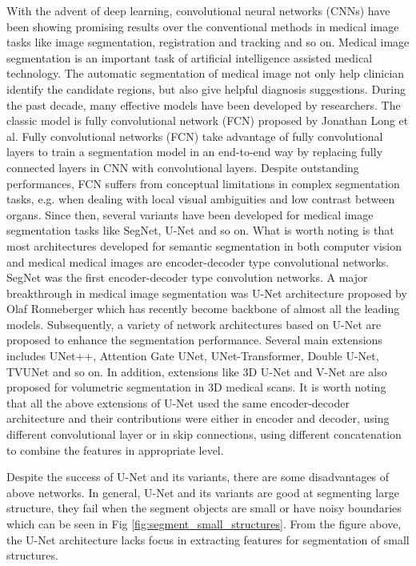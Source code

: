\documentclass{ieeeaccess}
\begin{document}
With the advent of deep learning, convolutional neural networks (CNNs) have been showing promising results over the conventional methods in medical image tasks like image segmentation, registration and tracking and so on. Medical image segmentation is an important task of artificial intelligence assisted medical technology. The automatic segmentation of medical image not only help clinician identify the candidate regions, but also give helpful diagnosis suggestions. During the past decade, many effective models have been developed by researchers. The classic model is fully convolutional network (FCN) proposed by Jonathan Long et al\cite{LongSD15}. Fully convolutional networks (FCN) take advantage of fully convolutional layers to train a segmentation model in an end-to-end way by replacing fully connected layers in CNN with convolutional layers. Despite outstanding performances, FCN suffers from conceptual limitations in complex segmentation tasks, e.g. when dealing with local visual ambiguities and low contrast between organs. Since then,  several variants have been developed for medical image segmentation tasks like SegNet, U-Net and so on. What is worth noting is that most architectures developed for semantic segmentation in both computer vision and medical medical images are encoder-decoder type convolutional networks. SegNet was the first encoder-decoder type convolution networks. A major breakthrough in medical image segmentation was U-Net architecture proposed by Olaf Ronneberger\cite{RonnebergerFB15} which has recently become backbone of almost all the leading models. Subsequently, a variety of network architectures based on U-Net are proposed to enhance the segmentation performance. Several main extensions includes UNet++, Attention Gate UNet, UNet-Transformer, Double U-Net, TVUNet and so on. In addition, extensions like 3D U-Net and V-Net are also proposed for volumetric segmentation in 3D medical scans. It is worth noting that all the above extensions of U-Net used the same encoder-decoder architecture and their contributions were either in encoder and decoder, using different convolutional layer or in skip connections, using different concatenation to combine the features in appropriate level. 

Despite the success of U-Net and its variants,  there are some disadvantages of above networks. In general, U-Net and its variants are good at segmenting large structure, they fail when the segment objects are small or have noisy boundaries which can be seen in Fig \ref{fig:segment_small_structures}. From the figure above, the U-Net architecture lacks focus in extracting features for segmentation of small structures. 
\end{document}
